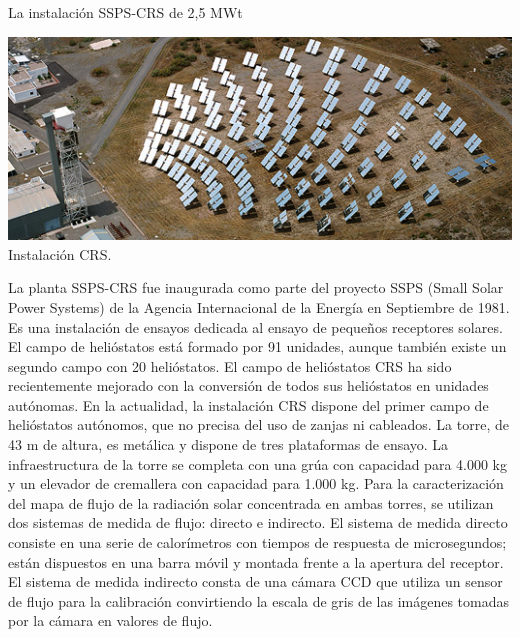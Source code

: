 La instalación SSPS-CRS de 2,5 MWt

\includegraphics[scale=1]{unnamed (6).png}
Instalación CRS. \cite{PSA2WebSite}

La planta SSPS-CRS fue inaugurada como parte del proyecto SSPS (Small Solar Power Systems) de la Agencia Internacional de la Energía en Septiembre de 1981.
Es una instalación de ensayos dedicada al ensayo de pequeños receptores solares. El campo de helióstatos está formado por 91 unidades, aunque también existe un segundo campo con 20 helióstatos.
El campo de helióstatos CRS ha sido recientemente mejorado con la conversión de todos sus helióstatos en unidades autónomas. En la actualidad, la instalación CRS dispone del primer campo de helióstatos autónomos, que no precisa del uso de zanjas ni cableados.
La torre, de 43 m de altura, es metálica y dispone de tres plataformas de ensayo.
La infraestructura de la torre se completa con una grúa con capacidad para 4.000 kg y un elevador de cremallera con capacidad para 1.000 kg.
Para la caracterización del mapa de flujo de la radiación solar concentrada en ambas torres, se utilizan dos sistemas de medida de flujo: directo e indirecto. El sistema de medida directo consiste en una serie de calorímetros con tiempos de respuesta de microsegundos; están dispuestos en una barra móvil y montada frente a la apertura del receptor. El sistema de medida indirecto consta de una cámara CCD que utiliza un sensor de flujo para la calibración convirtiendo la escala de gris de las imágenes tomadas por la cámara en valores de flujo. \cite{PSA4WebSite}